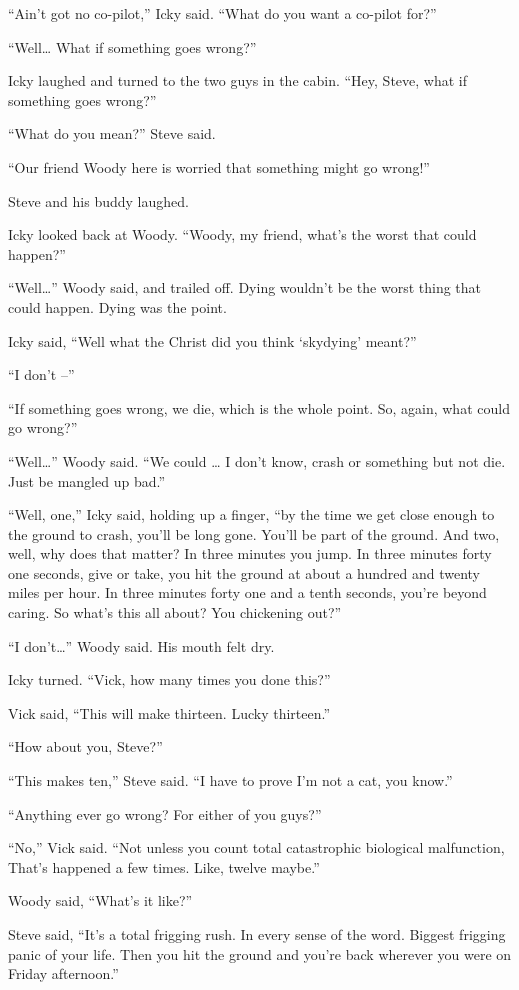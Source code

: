 “Ain’t got no co-pilot,” Icky said. “What do you want a co-pilot for?”

“Well… What if something goes wrong?”

Icky laughed and turned to the two guys in the cabin. “Hey, Steve, what if something goes wrong?”

“What do you mean?” Steve said.

“Our friend Woody here is worried that something might go wrong!”

Steve and his buddy laughed.

Icky looked back at Woody. “Woody, my friend, what’s the worst that could happen?”

“Well…” Woody said, and trailed off. Dying wouldn’t be the worst thing that could happen. Dying was the point.

Icky said, “Well what the Christ did you think `skydying’ meant?”

“I don’t –”

“If something goes wrong, we die, which is the whole point. So, again, what could go wrong?”

“Well…” Woody said. “We could … I don’t know, crash or something but not die. Just be mangled up bad.”

“Well, one,” Icky said, holding up a finger, “by the time we get close enough to the ground to crash, you’ll be long gone. You’ll be part of the ground. And two, well, why does that matter? In three minutes you jump. In three minutes forty one seconds, give or take, you hit the ground at about a hundred and twenty miles per hour. In three minutes forty one and a tenth seconds, you’re beyond caring. So what’s this all about? You chickening out?”

“I don’t…” Woody said. His mouth felt dry.

Icky turned. “Vick, how many times you done this?”

Vick said, “This will make thirteen. Lucky thirteen.”

“How about you, Steve?”

“This makes ten,” Steve said. “I have to prove I’m not a cat, you know.”

“Anything ever go wrong? For either of you guys?”

“No,” Vick said. “Not unless you count total catastrophic biological malfunction, That’s happened a few times. Like, twelve maybe.”

Woody said, “What’s it like?”

Steve said, “It’s a total frigging rush. In every sense of the word. Biggest frigging panic of your life. Then you hit the ground and you’re back wherever you were on Friday afternoon.”

